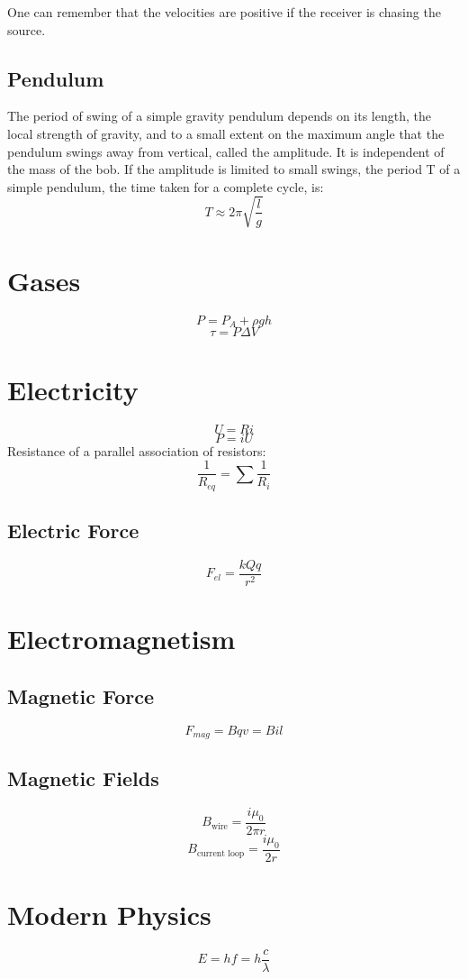 \documentclass[oneside]{book} %
\theoremstyle{plain}
\newcommand*\reciprocal[1]{\frac{1}{#1}}
\begin{document}
One can remember that the velocities are positive if the receiver is chasing
the source.

\section{Pendulum}
The period of swing of a simple gravity pendulum depends on its length, the
local strength of gravity, and to a small extent on the maximum angle that the
pendulum swings away from vertical, called the amplitude. It is independent of
the mass of the bob. If the amplitude is limited to small swings, the period T
of a simple pendulum, the time taken for a complete cycle, is:
\[T \approx 2 \pi \sqrt{\frac{l}{g}}\]

\chapter{Gases}
\[P = P_A + \rho g h\]
\[\tau = P \Delta V\]

\chapter{Electricity}
\[U = R i\]
\[P = i U\]
Resistance of a parallel association of resistors:
\[\reciprocal{R_{eq}} = \sum{\reciprocal{R_i}}\]

\section{Electric Force}
\[F_{el} = \frac{k Q q}{r^2}\]
\chapter{Electromagnetism}

\section{Magnetic Force}
\[F_{mag} = B q v = B i l\]

\section{Magnetic Fields}
\[B_{\text{wire}} = \frac{i \mu_0}{2 \pi r}\]
\[B_{\text{current loop}} = \frac{i \mu_0}{2 r}\]

\chapter{Modern Physics}
\[E = hf = h\frac{c}{\lambda}\]
\end{document}
